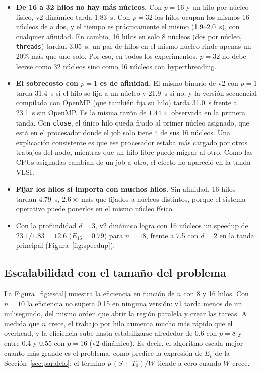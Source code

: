 \documentclass[12pt,a4paper]{article}
\begin{document}
\begin{itemize}
    \item \textbf{De 16 a 32 hilos no hay más núcleos.} Con $p=16$ y un hilo por núcleo físico, v2 dinámico tarda 1.83~s. Con $p=32$ los hilos ocupan los mismos 16 núcleos de a dos, y el tiempo es prácticamente el mismo (1.9--2.0~s), con cualquier afinidad. En cambio, 16 hilos en solo 8 núcleos (dos por núcleo, \texttt{threads}) tardan 3.05~s: un par de hilos en el mismo núcleo rinde apenas un 20\% más que uno solo. Por eso, en todos los experimentos, $p=32$ no debe leerse como 32 núcleos sino como 16 núcleos con hyperthreading.
    \item \textbf{El sobrecosto con $p=1$ es de afinidad.} El mismo binario de v2 con $p=1$ tarda 31.4~s si el hilo se fija a un núcleo y 21.9~s si no, y la versión secuencial compilada con OpenMP (que también fija su hilo) tarda 31.0~s frente a 23.1~s sin OpenMP. Es la misma razón de $1.44\times$ observada en la primera tanda. Con \texttt{close}, el único hilo queda fijado al primer núcleo asignado, que está en el procesador donde el job solo tiene 4 de sus 16 núcleos. Una explicación consistente es que ese procesador estaba más cargado por otros trabajos del nodo, mientras que un hilo libre puede migrar al otro. Como las CPUs asignadas cambian de un job a otro, el efecto no apareció en la tanda VLSI.
    \item \textbf{Fijar los hilos sí importa con muchos hilos.} Sin afinidad, 16 hilos tardan 4.79~s, $2.6\times$ más que fijados a núcleos distintos, porque el sistema operativo puede ponerlos en el mismo núcleo físico.
    \item Con la profundidad $d=3$, v2 dinámico logra con 16 núcleos un speedup de $23.1/1.83 = 12.6$ ($E_{16}=0.79$) para $n=18$, frente a 7.5 con $d=2$ en la tanda principal (Figura~\ref{fig:speedup}).
\end{itemize}

\subsection{Escalabilidad con el tamaño del problema}

La Figura~\ref{fig:escal} muestra la eficiencia en función de $n$ con 8 y 16 hilos. Con $n=10$ la eficiencia no supera 0.15 en ninguna versión: v1 tarda menos de un milisegundo, del mismo orden que abrir la región paralela y crear las tareas. A medida que $n$ crece, el trabajo por hilo aumenta mucho más rápido que el overhead, y la eficiencia sube hasta estabilizarse alrededor de 0.6 con $p=8$ y entre 0.4 y 0.55 con $p=16$ (v2 dinámico). Es decir, el algoritmo escala mejor cuanto más grande es el problema, como predice la expresión de $E_p$ de la Sección~\ref{sec:paralelo}: el término $p\,(S + T_0)/W$ tiende a cero cuando $W$ crece.
\end{document}
